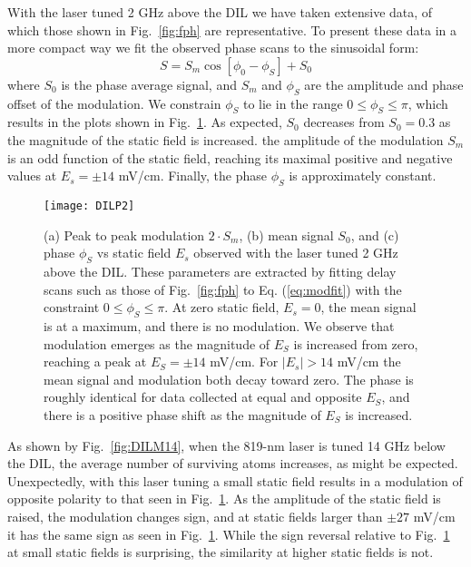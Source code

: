 \documentclass[aps,pra,reprint,groupedaddress]{revtex4-1}
\begin{document}
With the laser tuned 2 GHz above the DIL we have taken extensive data, of which those shown in Fig.~\ref{fig:fph} are representative. To present these data in a more compact way we fit the observed phase scans to the sinusoidal form:
\begin{equation} \label{eq:modfit}
S = S_m \cos{[\phi_0 - \phi_S]} + S_0
\end{equation}
where $S_0$ is the phase average signal, and $S_m$ and $\phi_S$ are the amplitude and phase offset of the modulation. We constrain $\phi_S$ to lie in the range $0\leq \phi_S \leq \pi$, which results in the plots shown in Fig.~\ref{fig:DILP2}. As expected, $S_0$ decreases from $S_0=0.3$  as the magnitude of the static field is increased. the amplitude of the modulation $S_m$ is an odd function of the static field, reaching its maximal positive and negative values at $E_s=\pm 14$ mV/cm. Finally, the phase $\phi_S$ is approximately constant.

\begin{figure}
	\texttt{[image: DILP2]}
	\caption{(a) Peak to peak modulation $2 \cdot S_m$, (b) mean signal $S_0$, and (c) phase $\phi_S$ vs static field $E_s$ observed with the laser tuned 2 GHz above the DIL. These parameters are extracted by fitting delay scans such as those of Fig.~\ref{fig:fph} to Eq. (\ref{eq:modfit}) with the constraint $0 \leq \phi_S \leq \pi$. At zero static field, $E_s = 0$, the mean signal is at a maximum, and there is no modulation. We observe that modulation emerges as the magnitude of $E_S$ is increased from zero, reaching a peak at $E_S = \pm 14$ mV/cm. For $|E_s| > 14$ mV/cm the mean signal and modulation both decay toward zero. The phase is roughly identical for data collected at equal and opposite $E_S$, and there is a positive phase shift as the magnitude of $E_S$ is increased.}
	\label{fig:DILP2}
\end{figure}

As shown by Fig.~\ref{fig:DILM14}, when the 819-nm laser is tuned 14 GHz below the DIL, the average number of surviving atoms increases, as might be expected. Unexpectedly, with this laser tuning a small static field results in a modulation of opposite polarity to that seen in Fig.~\ref{fig:DILP2}. As the amplitude of the static field is raised, the modulation changes sign, and at static fields larger than $\pm 27$ mV/cm it has the same sign as seen in Fig.~\ref{fig:DILP2}. While the sign reversal relative to Fig.~\ref{fig:DILP2} at small static fields is surprising, the similarity at higher static fields is not.
\end{document}
